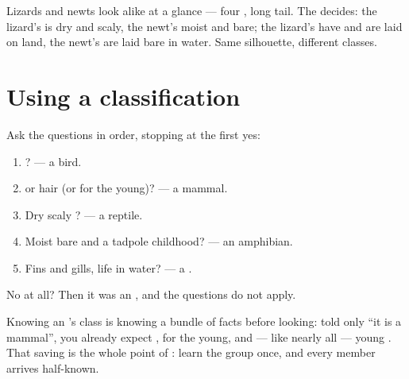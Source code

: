 \begin{remark}\label{rem:g4:classifying-animals:confusion}
Lizards and newts look alike at a glance --- four , long
tail. The  decides: the lizard's is dry and scaly, the
newt's moist and bare; the lizard's  have  and are
laid on land, the newt's are laid bare in water. Same
silhouette, different classes.
\end{remark}

\section{Using a classification}

\begin{method}\label{met:g4:classifying-animals:place}
Ask the questions in order, stopping at the first yes:
\begin{enumerate}
  \item {}? --- a bird.
  \item {} or hair (or  for the young)? --- a mammal.
  \item Dry scaly ? --- a reptile.
  \item Moist bare  and a tadpole childhood? --- an
        amphibian.
  \item Fins and gills, life in water? --- a .
\end{enumerate}
No  at all? Then it was an , and the
questions do not apply.
\end{method}

\begin{proposition}\label{prop:g4:classifying-animals:free}
Knowing an 's class is knowing a bundle of facts before
looking: told only ``it is a mammal'', you already expect , 
for the young, and --- like nearly all  --- young . That saving is the whole point of : learn
the group once, and every member arrives half-known.
\end{proposition}
\admitted


